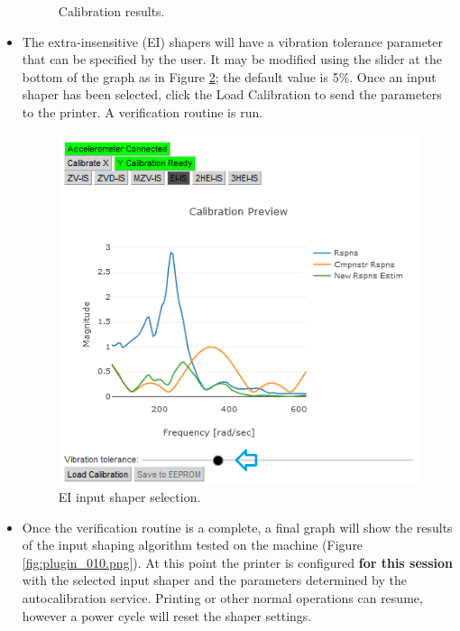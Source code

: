 \documentclass[12pt]{article}
\begin{document}
\begin{itemize}
\begin{figure}[H]
			\caption{Calibration results.}
			\label{fig:plugin_008.png}
		\end{figure}
	\item The extra-insensitive (EI) shapers will have a vibration tolerance parameter that can be specified by the user. It may be modified using the slider at the bottom of the graph as in Figure \ref{fig:plugin_009.png}; the default value is 5\%. Once an input shaper has been selected, click the Load Calibration to send the parameters to the printer. A verification routine is run.
		\begin{figure}[H]
			\centering
			\includegraphics{plugin_009.png}
			\caption{EI input shaper selection.}
			\label{fig:plugin_009.png}
		\end{figure}
	\item Once the verification routine is a complete, a final graph will show the results of the input shaping algorithm tested on the machine (Figure \ref{fig:plugin_010.png}). At this point the printer is configured \textbf{for this session} with the selected input shaper and the parameters determined by the autocalibration service. Printing or other normal operations can resume, however a power cycle will reset the shaper settings.
		\begin{figure}[H]
			\centering

\end{figure}
\end{itemize}
\end{document}
